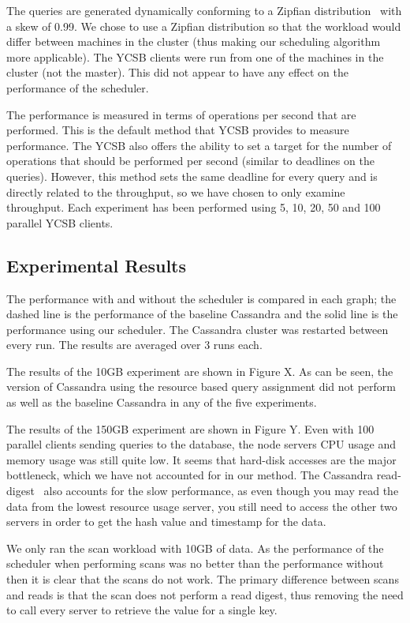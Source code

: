 \documentclass[]{acm_proc_article-sp}
\begin{document}
The queries are generated dynamically conforming to a Zipfian distribution~\cite{Quckly Generating Billion-Record Synthetic Databases} with a skew of 0.99. We chose to use a Zipfian distribution so that the workload would differ between machines in the cluster (thus making our scheduling algorithm more applicable). The YCSB clients were run from one of the machines in the cluster (not the master). This did not appear to have any effect on the performance of the scheduler. 

The performance is measured in terms of operations per second that are performed. This is the default method that YCSB provides to measure performance. The YCSB also offers the ability to set a target for the number of operations that should be performed per second (similar to deadlines on the queries). However, this method sets the same deadline for every query and is directly related to the throughput, so we have chosen to only examine throughput. Each experiment has been performed using 5, 10, 20, 50 and 100 parallel YCSB clients.

\subsection{Experimental Results}
The performance with and without the scheduler is compared in each graph; the dashed line is the performance of the baseline Cassandra and the solid line is the performance using our scheduler. The Cassandra cluster was restarted between every run. The results are averaged over 3 runs each.

The results of the 10GB experiment are shown in Figure X. As can be seen, the version of Cassandra using the resource based query assignment did not perform as well as the baseline Cassandra in any of the five experiments.

The results of the 150GB experiment are shown in Figure Y. Even with 100 parallel clients sending queries to the database, the node servers CPU usage and memory usage was still quite low. It seems that hard-disk accesses are the major bottleneck, which we have not accounted for in our method. The Cassandra read-digest~\cite{http://wiki.apache.org/cassandra/DigestQueries} also accounts for the slow performance, as even though you may read the data from the lowest resource usage server, you still need to access the other two servers in order to get the hash value and timestamp for the data.

We only ran the scan workload with 10GB of data. As the performance of the scheduler when performing scans was no better than the performance without then it is clear that the scans do not work. The primary difference between scans and reads is that the scan does not perform a read digest, thus removing the need to call every server to retrieve the value for a single key.
\end{document}
